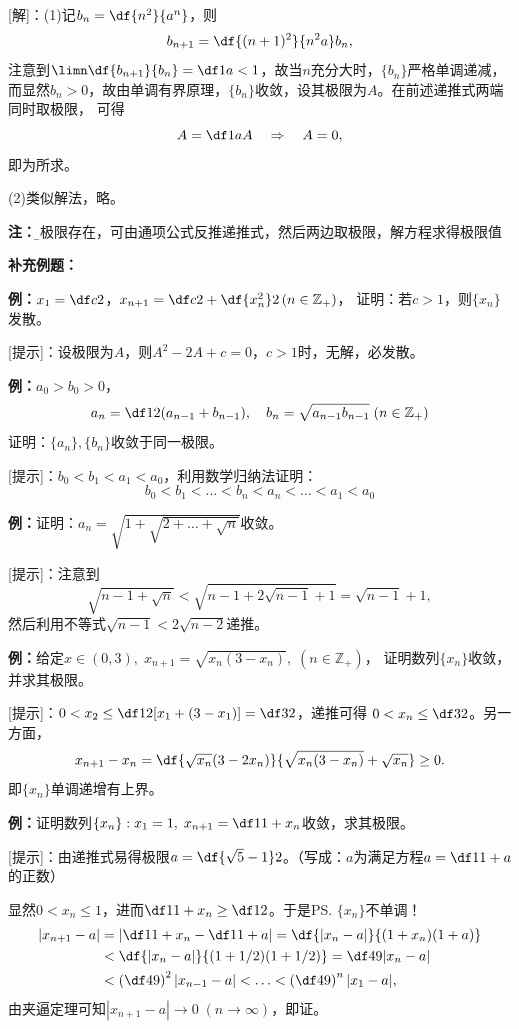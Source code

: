[解]：(1)\;记$b_n=\df{n^2}{a^n}$，则
$$b_{n+1}=\df{(n+1)^2}{n^2a}b_n,$$
注意到$\limn\df{b_{n+1}}{b_n}=\df1a<1$，故当$n$充分大时，$\{b_n\}$严格单调递减，
而显然$b_n>0$，故由单调有界原理，$\{b_n\}$收敛，设其极限为$A$。在前述递推式两端同时取极限，
可得
$$A=\df1aA\quad\Rightarrow\quad A=0,$$
即为所求。

(2)\;类似解法，略。

{\bf 注：}{\b 若极限存在，可由通项公式反推递推式，然后两边取极限，解方程求得极限值}

{\bf 补充例题：}

{\bf 例：}$x_1=\df c2$，$x_{n+1}=\df c2+\df{x_n^2}2\,(n\in\mathbb{Z}_+)$，
证明：若$c>1$，则$\{x_n\}$发散。

[提示]：设极限为$A$，则$A^2-2A+c=0$，$c>1$时，无解，必发散。

{\bf 例：}$a_0>b_0>0$，
$$a_n=\df12(a_{n-1}+b_{n-1}),\quad
b_n=\sqrt{a_{n-1}b_{n-1}}\;(n\in\mathbb{Z}_+)$$
证明：$\{a_n\},\{b_n\}$收敛于同一极限。

[提示]：$b_0<b_1<a_1<a_0$，利用数学归纳法证明：
$$b_0<b_1<\ldots<b_n<a_n<\ldots<a_1<a_0$$

{\bf 例：}证明：$a_n=\sqrt{1+\sqrt{2+\ldots+\sqrt{n}}}$收敛。

[提示]：注意到
$$\sqrt{n-1+\sqrt n}<\sqrt{n-1+2\sqrt{n-1}+1}=\sqrt{n-1}+1,$$
然后利用不等式$\sqrt{n-1}<2\sqrt{n-2}$递推。

{\bf 例：}给定$x\in(0,3),\; x_{n+1}=\sqrt{x_n(3-x_n)},\;(n\in\mathbb{Z}_+)$，
证明数列$\{x_n\}$收敛，并求其极限。

[提示]：$0<x_2\leq\df12[x_1+(3-x_1)]=\df32$，递推可得
$0<x_n\leq\df32$。另一方面，
$$x_{n+1}-x_n=\df{\sqrt{x_n}(3-2x_n)}{\sqrt{x_n(3-x_n)}+\sqrt{x_n}}\geq 0.$$
即$\{x_n\}$单调递增有上界。

{\bf 例：}证明数列$\{x_n\}:x_1=1,\;x_{n+1}=\df1{1+x_n}$收敛，求其极限。

[提示]：由递推式易得极限$a=\df{\sqrt5-1}2$。（写成：$a$为满足方程$a=\df1{1+a}$的正数）

显然$0<x_n\leq1$，进而$\df1{1+x_n}\geq\df12$。于是\ps{$\{x_n\}$不单调！}
\begin{align}
	|x_{n+1}-a|&=\left|\df1{1+x_n}-\df1{1+a}\right|=\df{|x_n-a|}{(1+x_n)(1+a)}\notag\\
	&<\df{|x_n-a|}{(1+1/2)(1+1/2)}=\df49|x_n-a|\notag\\
	&<\left(\df49\right)^2|x_{n-1}-a|<\ldots<\left(\df49\right)^{n}|x_1-a|,\notag
\end{align}
由夹逼定理可知$|x_{n+1}-a|\to0\;(n\to\infty)$，即证。

